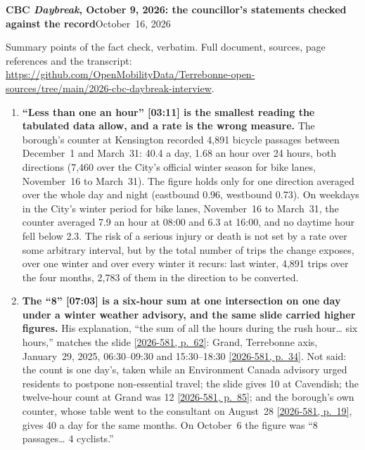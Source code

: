 \documentclass[10pt,letterpaper]{article}
\newcommand{\repourl}{https://github.com/OpenMobilityData/Terrebonne-open-sources}
\newcommand{\pagesurl}{https://openmobilitydata.github.io/Terrebonne-access-requests}
\newcommand{\cliptime}[1]{\textsf{\small[#1]}}
\newcommand{\pgl}[2]{\href{\pagesurl/2026-581/raw/01_emails_mandate_counts.pdf\#page=#1}{\textsf{\small[2026-581, p.~#2]}}}
\newcommand{\pg}[1]{\pgl{#1}{#1}}
\begin{document}
{\large\bfseries CBC \emph{Daybreak}, October 9, 2026: the councillor's statements checked against the record}\hfill{\small October~16, 2026}

\vspace{-0.2em}
{\small Summary points of the fact check, verbatim. Full document, sources, page references and the transcript:\\ \href{\repourl/tree/main/2026-cbc-daybreak-interview}{\repourl/tree/main/2026-cbc-daybreak-interview}.}
\vspace{0.4em}

\begin{enumerate}[nosep,itemsep=0.3em,leftmargin=1.4em]
  \item \begin{minipage}[t]{\linewidth}\textbf{``Less than one an hour'' \cliptime{03:11} is the smallest reading the tabulated data allow, and a rate is the wrong measure.} The borough's counter at Kensington recorded 4{,}891 bicycle passages between December~1 and March~31: 40.4 a day, 1.68 an hour over 24 hours, both directions (7{,}460 over the City's official winter season for bike lanes, November~16 to March~31). The figure holds only for one direction averaged over the whole day and night (eastbound 0.96, westbound 0.73). On weekdays in the City's winter period for bike lanes, November~16 to March~31, the counter averaged 7.9 an hour at 08:00 and 6.3 at 16:00, and no daytime hour fell below 2.3. The risk of a serious injury or death is not set by a rate over some arbitrary interval, but by the total number of trips the change exposes, over one winter and over every winter it recurs: last winter, 4{,}891 trips over the four months, 2{,}783 of them in the direction to be converted.\end{minipage}\vspace{0.35em}
  \item \begin{minipage}[t]{\linewidth}\textbf{The ``8'' \cliptime{07:03} is a six-hour sum at one intersection on one day under a winter weather advisory, and the same slide carried higher figures.} His explanation, ``the sum of all the hours during the rush hour… six hours,'' matches the slide \pg{62}: Grand, Terrebonne axis, January~29, 2025, 06:30--09:30 and 15:30--18:30 \pg{34}. Not said: the count is one day's, taken while an Environment Canada advisory urged residents to postpone non-essential travel; the slide gives 10 at Cavendish; the twelve-hour count at Grand was 12 \pg{85}; and the borough's own counter, whose table went to the consultant on August~28 \pg{19}, gives 40 a day for the same months. On October~6 the figure was ``8 passages… 4 cyclists.''\end{minipage}\vspace{0.35em}

\end{enumerate}
\end{document}
